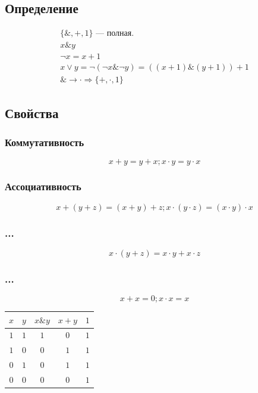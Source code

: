 \documentclass{article}
\begin{document}
\subsection{Определение}
\begin{gather*}
    \{\&, +, 1\} \text{ --- полная.} \\
    x \& y \\
    \neg x = x + 1 \\
    x \vee y = \neg(\neg x \& \neg y) = \left( (x + 1) \& (y + 1) \right) + 1 \\
    \& \to \cdot \Rightarrow \{+, \cdot, 1\}
\end{gather*}

\subsection{Свойства}

\subsubsection{Коммутативность}
\[
    x + y = y + x; x \cdot y = y \cdot x
\]

\subsubsection{Ассоциативность}
\[
    x + (y + z) = (x + y) + z; x \cdot (y \cdot z) = (x \cdot y) \cdot x
\]

\subsubsection{...}
\[
    x \cdot (y + z) = x \cdot y + x \cdot z
\]

\subsubsection{...}
\[
    x + x = 0; x \cdot x = x
\]

\begin{tabular}{c|c|c|c|c}
    $x$ & $y$ & $x \& y$ & $x + y$ & $1$ \\
    \hline
    $1$ & $1$ & $1$      & $0$     & $1$ \\
    $1$ & $0$ & $0$      & $1$     & $1$ \\
    $0$ & $1$ & $0$      & $1$     & $1$ \\
    $0$ & $0$ & $0$      & $0$     & $1$
\end{tabular}
\end{document}
